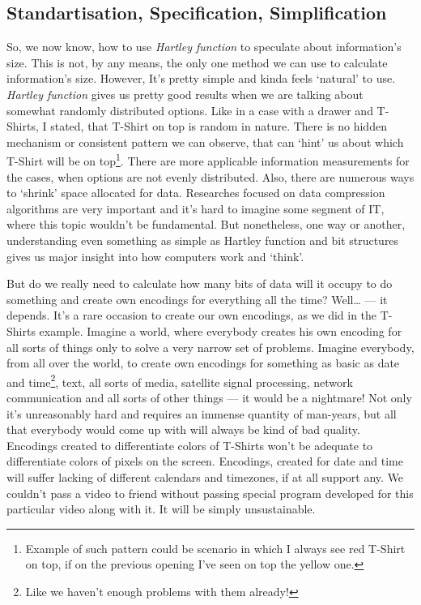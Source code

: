 \documentclass{article}
\begin{document}
        \subsection{Standartisation, Specification, Simplification}
            So, we now know, how to use \emph{Hartley function} to speculate about information's size. This is not, by any means, the only one method we can use to 
            calculate information's size. However, It's pretty simple and kinda feels `natural' to use. \emph{Hartley function} gives us pretty good results when we are talking
            about somewhat randomly distributed options. Like in a case with a drawer and T-Shirts, I stated, that T-Shirt on top is random in nature. There is no 
            hidden mechanism or consistent pattern we can observe, that can `hint' us about which T-Shirt will be on top\footnote{Example of such pattern could
            be scenario in which I always see red T-Shirt on top, if on   the previous opening I've seen on top the yellow one.}. There are more applicable information 
            measurements for the cases, when options are not evenly distributed. Also, there are numerous ways to `shrink' space allocated for data. Researches focused
            on data compression algorithms are very important and it's hard to imagine some segment of IT, where this topic wouldn't be fundamental. But nonetheless, 
            one way or another, understanding even something as simple as Hartley function and bit structures gives us major insight into how computers work and `think'. \par

            But do we really need to calculate how many bits of data will it occupy to do something and create own encodings for everything all the time? Well\ldots{} --- it depends. 
            It's a rare occasion to create our own encodings, as we did in the T-Shirts example. Imagine a world, where everybody creates his own encoding for all 
            sorts of things only to solve a very narrow set of problems. Imagine everybody, from all over the world, to create own encodings for something as basic
            as date and time\footnote{Like we haven't enough problems with them already!}, text, all sorts of media, satellite signal processing, network communication and all
            sorts of other things --- it would be a nightmare! Not only it's unreasonably hard and requires an immense quantity of man-years, but all that everybody would 
            come up with will always be kind of bad quality. Encodings created to differentiate colors of T-Shirts won't be adequate to differentiate colors of pixels on 
            the screen. Encodings, created for date and time will suffer lacking of different calendars and timezones, if at all support any. We couldn't pass a video to 
            friend without passing special program developed for this particular video along with it. It will be simply unsustainable. \par
\end{document}
